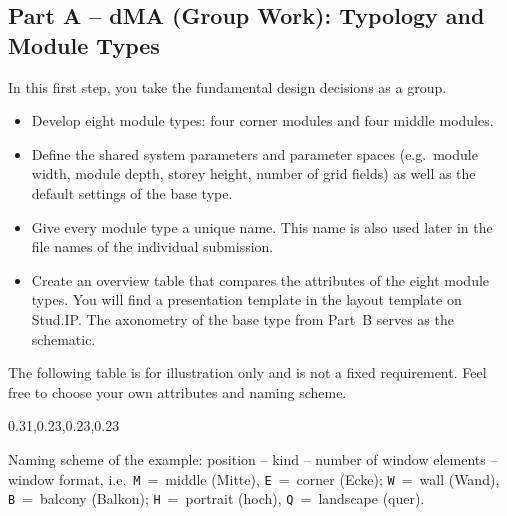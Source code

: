 \subsection{Part A – dMA (Group Work): Typology and Module Types}
In this first step, you take the fundamental design decisions as a group.
\begin{itemize}
  \item Develop eight module types: four corner modules and four middle modules.
  \item Define the shared system parameters and parameter spaces (e.g.~module width, module depth, storey height, number of grid fields) as well as the default settings of the base type.
  \item Give every module type a unique name. This name is also used later in the file names of the individual submission.
  \item Create an overview table that compares the attributes of the eight module types. You will find a presentation template in the layout template on Stud.IP. The axonometry of the base type from Part~B serves as the schematic.
\end{itemize}
The following table is for illustration only and is not a fixed requirement. Feel free to choose your own attributes and naming scheme.
\begin{Table}[title=Example of the Overview Table, break=false]
\begin{SemioTable}{0.31,0.23,0.23,0.23}
\end{SemioTable}
\end{Table}
Naming scheme of the example: position – kind – number of window elements – window format, i.e.~\texttt{M}~=~middle (Mitte), \texttt{E}~=~corner (Ecke); \texttt{W}~=~wall (Wand), \texttt{B}~=~balcony (Balkon); \texttt{H}~=~portrait (hoch), \texttt{Q}~=~landscape (quer).
